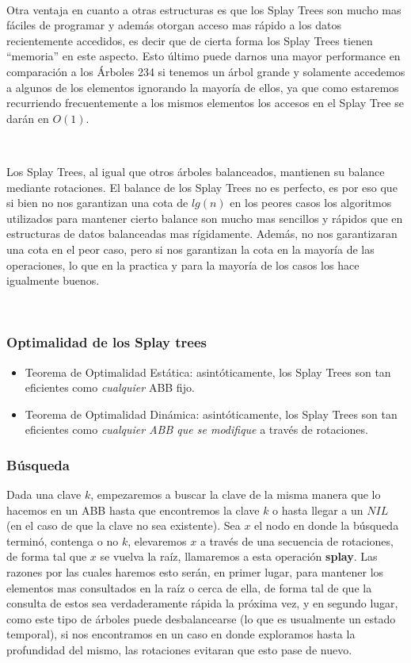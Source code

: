 ~

Otra ventaja en cuanto a otras estructuras es que los Splay Trees son mucho mas f\'aciles de programar y adem\'as otorgan acceso mas r\'apido a los datos recientemente accedidos, es decir que de cierta forma los Splay Trees tienen ``memoria'' en este aspecto. Esto \'ultimo puede darnos una mayor performance en comparaci\'on a los \'Arboles 234 si tenemos un \'arbol grande y solamente accedemos a algunos de los elementos ignorando la mayor\'ia de ellos, ya que como estaremos recurriendo frecuentemente a los mismos elementos los accesos en el Splay Tree se dar\'an en $O(1)$.

~

Los Splay Trees, al igual que otros \'arboles balanceados, mantienen su balance mediante rotaciones. El balance de los Splay Trees no es perfecto, es por eso que si bien no nos garantizan una cota de $lg(n)$ en los peores casos los algoritmos utilizados para mantener cierto balance son mucho mas sencillos y r\'apidos que en estructuras de datos balanceadas mas r\'igidamente. Adem\'as, no nos garantizaran una cota en el peor caso, pero si nos garantizan la cota en la mayor\'ia de las operaciones, lo que en la practica y para la mayor\'ia de los casos los hace igualmente buenos.

~

\subsubsection{Optimalidad de los Splay trees}
\begin{itemize}
 \item Teorema de Optimalidad Est\'atica: asint\'oticamente, los Splay Trees son tan eficientes como \textit{cualquier} ABB fijo.
 \item Teorema de Optimalidad Din\'amica: asint\'oticamente, los Splay Trees son tan eficientes como \textit{cualquier ABB que se modifique} a trav\'es de rotaciones.
\end{itemize}


\subsubsection{B\'usqueda}

Dada una clave $k$, empezaremos a buscar la clave de la misma manera que lo hacemos en un ABB hasta que encontremos la clave $k$ o hasta llegar a un $NIL$ (en el caso de que la clave no sea existente). Sea $x$ el nodo en donde la b\'usqueda termin\'o, contenga o no $k$, elevaremos $x$ a trav\'es de una secuencia de rotaciones, de forma tal que $x$ se vuelva la ra\'iz, llamaremos a esta operaci\'on \textbf{splay}. Las razones por las cuales haremos esto ser\'an, en primer lugar, para mantener los elementos mas consultados en la ra\'iz o cerca de ella, de forma tal de que la consulta de estos sea verdaderamente r\'apida la pr\'oxima vez, y en segundo lugar, como este tipo de \'arboles puede desbalancearse (lo que es usualmente un estado temporal), si nos encontramos en un caso en donde exploramos hasta la profundidad del mismo, las rotaciones evitaran que esto pase de nuevo.


